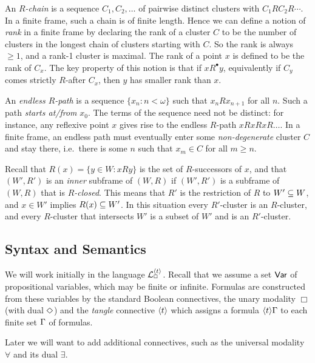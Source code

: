 An \emph{$R$-chain} is a sequence $C_1,C_2,\dots$ of pairwise distinct clusters with $C_1RC_2R\cdots$. In a finite frame, such a chain is of finite length. Hence we can define a notion of \emph{rank} in a finite frame by declaring the rank of a cluster $C$ to be the number of clusters in the longest chain of clusters starting with $C$. So the rank is always $\geq 1$, and a rank-1 cluster is maximal. The rank of a point $x$ is defined to be the rank of $C_x$. The key property of this notion is that if $xR^\bullet y$, equivalently if  $C_y$ comes strictly $R$-after $C_x$, then $y$ has smaller rank than $x$. 

An \emph{endless $R$-path} is a sequence $\{x_n:n<\omega\}$ such that $x_nRx_{n+1}$ for all $n$. Such a path \emph{starts at/from} $x_0$. The terms of the sequence need not be distinct: for instance, any reflexive point $x$ gives rise to the endless $R$-path  $xRxRxR\dots$.  In a finite frame, an endless path must eventually enter some \emph{non-degenerate} cluster $C$ and stay there, i.e.\ there is some $n$ such that $x_m\in C$ for all $m\geq n$.

Recall that $R(x)=\{y\in W:xRy\}$ is the set of $R$-successors of $x$, and that $(W',R')$ is an \emph{inner} subframe of 
$(W,R)$ if  $(W',R')$  is a subframe of  $(W,R)$ that is \emph{$R$-closed}. This means that $R'$ is the restriction of $R$ to $W'\subseteq W$, and  $x\in W' $ implies $R(x)\subseteq W'$. In this situation every $R'$-cluster is an $R$-cluster, and every $R$-cluster that intersects $W'$ is a subset of $W'$ and is an $R'$-cluster.
  
  
  \subsection{Syntax and Semantics}
  We will work initially in the language ${\cal L}_\Box^{\langle t\rangle}$.
Recall that we assume a set $\mathsf{Var}$ of propositional variables, which may be finite or infinite. Formulas are constructed from these variables by the standard Boolean connectives, the unary modality $\Box$ (with dual $\Diamond$)
and the \emph{tangle} connective $\langle t\rangle$ which assigns a formula  $\langle t\rangle\Gamma$ to each finite set $\Gamma$ of formulas.
  
  Later we will want to add additional connectives, such as the universal modality $\forall$ and its dual $\exists$.
  
